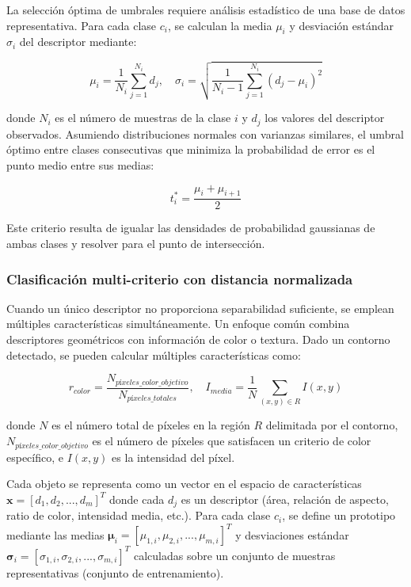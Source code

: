 La selección óptima de umbrales requiere análisis estadístico de una base de datos representativa. Para cada clase $c_i$, se calculan la media $\mu_i$ y desviación estándar $\sigma_i$ del descriptor mediante:

\begin{equation}
\mu_i = \frac{1}{N_i}\sum_{j=1}^{N_i} d_j, \quad \sigma_i = \sqrt{\frac{1}{N_i-1}\sum_{j=1}^{N_i}(d_j - \mu_i)^2}
\end{equation}

donde $N_i$ es el número de muestras de la clase $i$ y $d_j$ los valores del descriptor observados. Asumiendo distribuciones normales con varianzas similares, el umbral óptimo entre clases consecutivas que minimiza la probabilidad de error es el punto medio entre sus medias:

\begin{equation}
t_i^* = \frac{\mu_i + \mu_{i+1}}{2}
\end{equation}

Este criterio resulta de igualar las densidades de probabilidad gaussianas de ambas clases y resolver para el punto de intersección.

\subsubsection{Clasificación multi-criterio con distancia normalizada}

Cuando un único descriptor no proporciona separabilidad suficiente, se emplean múltiples características simultáneamente. Un enfoque común combina descriptores geométricos con información de color o textura. Dado un contorno detectado, se pueden calcular múltiples características como:

\begin{equation}
r_{color} = \frac{N_{píxeles\_color\_objetivo}}{N_{píxeles\_totales}}, \quad I_{media} = \frac{1}{N}\sum_{(x,y) \in R} I(x,y)
\end{equation}

donde $N$ es el número total de píxeles en la región $R$ delimitada por el contorno, $N_{píxeles\_color\_objetivo}$ es el número de píxeles que satisfacen un criterio de color específico, e $I(x,y)$ es la intensidad del píxel.

Cada objeto se representa como un vector en el espacio de características $\mathbf{x} = [d_1, d_2, ..., d_m]^T$ donde cada $d_j$ es un descriptor (área, relación de aspecto, ratio de color, intensidad media, etc.). Para cada clase $c_i$, se define un prototipo mediante las medias $\boldsymbol{\mu}_i = [\mu_{1,i}, \mu_{2,i}, ..., \mu_{m,i}]^T$ y desviaciones estándar $\boldsymbol{\sigma}_i = [\sigma_{1,i}, \sigma_{2,i}, ..., \sigma_{m,i}]^T$ calculadas sobre un conjunto de muestras representativas (conjunto de entrenamiento).

